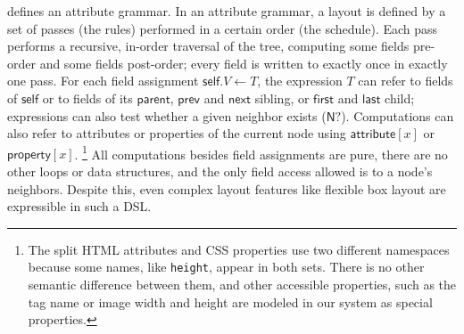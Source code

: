  defines an attribute grammar.
In an attribute grammar, a layout is defined by
  a set of passes (the rules)
  performed in a certain order (the schedule).
Each pass performs a recursive, in-order traversal of the tree,
  computing some fields pre-order and some fields post-order;
  every field is written to exactly once in exactly one pass.
For each field assignment $\mathsf{self}.V \gets T$,
  the expression $T$ can refer
  to fields of $\mathsf{self}$ or
  to fields of its $\mathsf{parent}$,
  $\mathsf{prev}$ and $\mathsf{next}$ sibling,
  or $\mathsf{first}$ and $\mathsf{last}$ child;
  expressions can also test whether a given neighbor
  exists ($\mathsf{N?}$).
Computations can also refer to
  attributes or properties of the current node
  using $\mathsf{attribute}[x]$ or $\mathsf{property}[x]$.%
\footnote{
The split HTML attributes and CSS properties
  use two different namespaces
  because some names, like \texttt{height},
  appear in both sets.
There is no other semantic difference between them,
  and other accessible properties,
  such as the tag name or image width and height
  are modeled in our system as special properties.
}
All computations besides field assignments are pure,
  there are no other loops or data structures,
  and the only field access allowed is to a node's neighbors.
Despite this, even complex layout features
  like flexible box layout are expressible in such a DSL.

